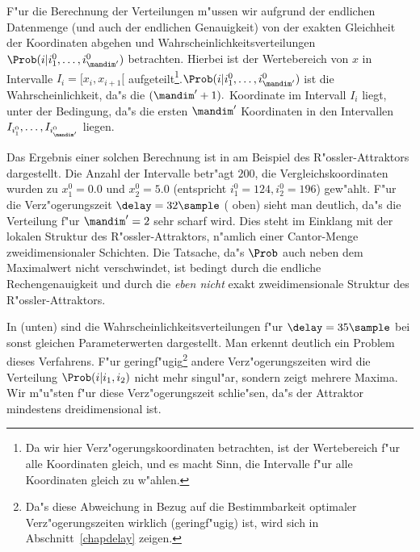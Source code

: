 F"ur die Berechnung der Verteilungen m"ussen wir aufgrund der endlichen Datenmenge (und
auch der endlichen Genauigkeit) von der exakten Gleichheit der Koordinaten abgehen und
Wahrscheinlichkeitsverteilungen $\Prob(i\vert i^0_1,\dots,i^0_{\mandim'})$ betrachten.
Hierbei ist der Wertebereich von $x$ in Intervalle $I_i=[x_i,x_{i+1}[$
aufgeteilt\footnote{Da wir hier Verz"ogerungskoordinaten betrachten, ist der Wertebereich
  f"ur alle Koordinaten gleich, und es macht Sinn, die Intervalle f"ur alle Koordinaten
  gleich zu w"ahlen.}.\@ $\Prob(i\vert i^0_1,\dots,i^0_{\mandim'})$ ist die
Wahrscheinlichkeit, da"s die $(\mandim'+1).$ Koordinate im Intervall $I_i$ liegt, unter der
Bedingung, da"s die ersten $\mandim'$ Koordinaten in den Intervallen
$I_{i^0_1},\dots,I_{i^0_{\mandim'}}$ liegen.



Das Ergebnis einer solchen Berechnung ist in  am Beispiel des
R"ossler-Attraktors dargestellt. Die Anzahl der Intervalle betr"agt $200$, die
Vergleichskoordinaten wurden zu $x^0_1=0.0$ und $x^0_2=5.0$ (entspricht $i^0_1=124,
i^0_2=196$) gew"ahlt. F"ur die Verz"ogerungszeit $\delay=32\sample$ ( oben)
sieht man deutlich, da"s die Verteilung f"ur $\mandim'=2$ sehr scharf wird. Dies steht im
Einklang mit der lokalen Struktur des R"ossler-Attraktors, n"amlich einer Cantor-Menge
zweidimensionaler Schichten. Die Tatsache, da"s $\Prob$ auch neben dem Maximalwert nicht
verschwindet, ist  bedingt durch die endliche Rechengenauigkeit und durch
die \emph{eben nicht} exakt zweidimensionale Struktur des R"ossler-Attraktors.

In  (unten) sind die Wahrscheinlichkeitsverteilungen f"ur
$\delay=35\sample$ bei sonst gleichen Parameterwerten dargestellt. Man erkennt deutlich ein
Problem dieses Verfahrens. F"ur geringf"ugig\footnote{Da"s diese Abweichung in Bezug auf
  die Bestimmbarkeit optimaler Verz"ogerungszeiten wirklich \begriff(geringf"ugig) ist,
  wird sich in Abschnitt~\ref{chapdelay} zeigen.} andere Verz"ogerungszeiten wird die
Verteilung $\Prob(i\vert i_1,i_2)$ nicht mehr singul"ar, sondern zeigt mehrere Maxima. Wir
m"u"sten f"ur diese Verz"ogerungszeit schlie"sen, da"s der Attraktor mindestens
dreidimensional ist.





